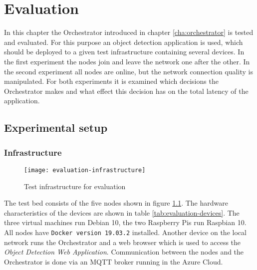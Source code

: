 \chapter{Evaluation\label{cha:evaluation}}

In this chapter the Orchestrator introduced in chapter \ref{cha:orchestrator} is tested and evaluated. For this purpose an object detection application is used, which should be deployed to a given test infrastructure containing several devices. In the first experiment the nodes join and leave the network one after the other. In the second experiment all nodes are online, but the network connection quality is manipulated. For both experiments it is examined which decisions the Orchestrator makes and what effect this decision has on the total latency of the application.







\section{Experimental setup}

\subsection{Infrastructure\label{sec:eval-infrastructure}}

\begin{figure}[htb]
    \centering
    \texttt{[image: evaluation-infrastructure]}
    \caption{Test infrastructure for evaluation}
    \label{fig:evaluation-infrastructure}
\end{figure}

The test bed consists of the five nodes shown in figure \ref{fig:evaluation-infrastructure}. The hardware characteristics of the devices are shown in table \ref{tab:evaluation-devices}. The three virtual machines run Debian 10, the two Raspberry Pis run Raspbian 10. All nodes have \texttt{Docker version 19.03.2} installed. Another device on the local network runs the Orchestrator and a web browser which is used to access the \textit{Object Detection Web Application}. Communication between the nodes and the Orchestrator is done via an MQTT broker running in the Azure Cloud.

